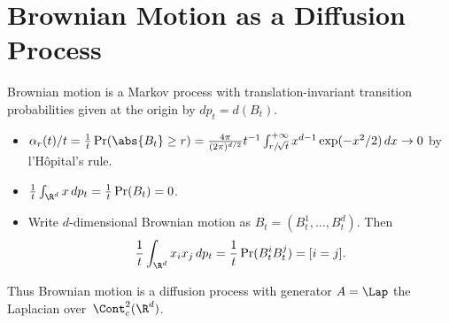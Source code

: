 \section	{Brownian Motion as a Diffusion Process}

Brownian motion is a Markov process
with translation-invariant transition probabilities given at the origin by
\( dp_t = d(B_t) \).
\begin	{itemize}
\item	\( \alpha_r(t)/t = \frac1t\Pr(\abs{B_t}\ge r)
	= \frac{4\pi}{(2\pi)^{d/2}} t^{-1} \int_{r/\!\sqrt t}^{+\infty}
		x^{d-1} \exp(-x^2/2) \,dx
	\to 0 \)
	by l'Hôpital's rule.
\item	\( \frac1t \int_{\R^d} x\,dp_t = \frac1t \Pr(B_t) = 0 \).
\item	Write $d$\nobreakdash-dimensional Brownian motion as
	\( B_t = (B^1_t,\dots,B^d_t) \).
	Then
	\begin	{equation*}
		\frac1t \int_{\R^d} x_i x_j \,dp_t
		=	\frac1t \Pr(B^i_t B^j_t)
		=	[i=j] \text.
	\end	{equation*}
\end	{itemize}
Thus Brownian motion is a diffusion process
with generator \( A = \Lap \) the Laplacian over~$\Cont^2_c(\R^d)$.
